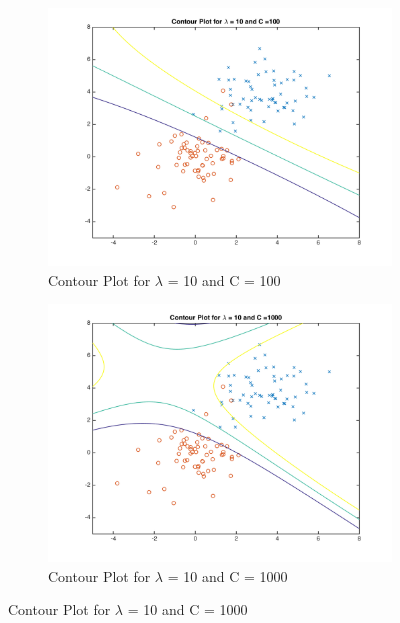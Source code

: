 \documentclass[english]{article}
\begin{document}
\begin{figure}[!htbp]


\begin{subfigure}{0.48\textwidth}
\includegraphics[width=\linewidth]{../plotC/plot_C_100}
\caption{Contour Plot for $\lambda$ = 10 and C = 100} 
\end{subfigure}\hspace*{\fill}
\begin{subfigure}{0.48\textwidth}
\includegraphics[width=\linewidth]{../plotC/plot_C_1000}
\caption{Contour Plot for $\lambda$ = 10 and C = 1000} \label{fig:b}
\end{subfigure}


\end{figure}
\end{document}
